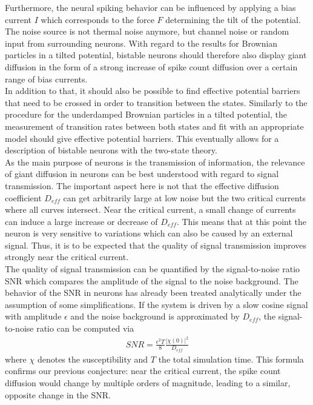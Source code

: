 \documentclass[12pt,a4paper]{article}
\begin{document}
Furthermore, the neural spiking behavior can be influenced by applying a bias current $I$ which corresponds to the force $F$ determining the tilt of the potential. The noise source is not thermal noise anymore, but channel noise or random input from surrounding neurons. With regard to the results for Brownian particles in a tilted potential, bistable neurons should therefore also display giant diffusion in the form of a strong increase of spike count diffusion over a certain range of bias currents.
\\
In addition to that, it should also be possible to find effective potential barriers that need to be crossed in order to transition between the states. Similarly to the procedure for the underdamped Brownian particles in a tilted potential, the measurement of transition rates between both states and fit with an appropriate model should give effective potential barriers. This eventually allows for a description of bistable neurons with the two-state theory. 
\\
As the main purpose of neurons is the transmission of information, the relevance of giant diffusion in neurons can be best understood with regard to signal transmission. The important aspect here is not that the effective diffusion coefficient $D_{eff}$ can get arbitrarily large at low noise but the two critical currents where all curves intersect. Near the critical current, a small change of currents can induce a large increase or decrease of $D_{eff}$. This means that at this point the neuron is very sensitive to variations which can also be caused by an external signal. Thus, it is to be expected that the quality of signal transmission improves strongly near the critical current.
\\
The quality of signal transmission can be quantified by the signal-to-noise ratio SNR which compares the amplitude of the signal to the noise background. The behavior of the SNR in neurons has already been treated analytically under the assumption of some simplifications. If the system is driven by a slow cosine signal with amplitude $\epsilon$ and the noise background is approximated by $D_{eff}$, the signal-to-noise ratio can be computed via\cite{snr}
\begin{align*}
SNR=\frac{\epsilon ^2T}{8}\frac{|\chi(0)|^2}{D_{eff}}
\end{align*}
where $\chi$ denotes the susceptibility and $T$ the total simulation time. This formula confirms our previous conjecture: near the critical current, the spike count diffusion would change by multiple orders of magnitude, leading to a similar, opposite change in the SNR. \\
\end{document}

